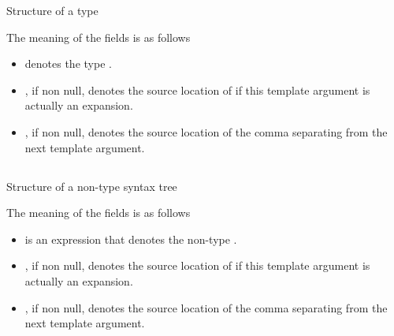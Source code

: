%
\begin{Structure}
	\caption{Structure of a type }
	\label{fig:ifc:SyntaxSort:TypeTemplateArgument}
\end{Structure}
%
The meaning of the fields is as follows
\begin{itemize}
	\item {} denotes the type .
	\item {}, if non null, denotes the source location of  if this template argument is actually an expansion.
	\item {}, if non null, denotes the source location of the comma separating from the next template argument.
\end{itemize}


\subsection{}
\label{sec:ifc:SyntaxSort:NonTypeTemplateArgument}

\begin{Structure}
	\caption{Structure of a non-type  syntax tree}
	\label{fig:ifc:SyntaxSort:NonTypeTemplateArgument}
\end{Structure}
%
The meaning of the fields is as follows
\begin{itemize}
	\item {} is an expression that denotes the non-type .
	\item {}, if non null, denotes the source location of  if this template argument is actually an expansion.
	\item {}, if non null, denotes the source location of the comma separating from the next template argument.
\end{itemize}

